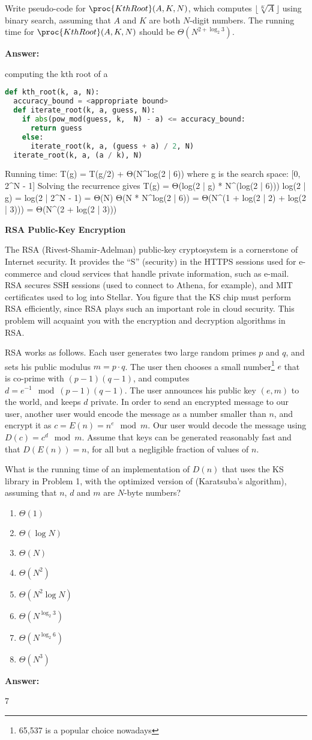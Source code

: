 \documentclass[12pt,twoside]{article}
\newcommand{\answer}{
 \par\medskip
 \textbf{Answer:}
}
\newcommand{\answerIp}{ \answer
computing the kth root of a
\begin{lstlisting}[language=Python]
def kth_root(k, a, N):
  accuracy_bound = <appropriate bound>
  def iterate_root(k, a, guess, N):
    if abs(pow_mod(guess, k,  N) - a) <= accuracy_bound:
      return guess
    else:
      iterate_root(k, a, (guess + a) / 2, N)
  iterate_root(k, a, (a / k), N)
\end{lstlisting}

Running time:
T(g) = T(g/2) + Θ(N^log(2 | 6))
where g is the search space: [0, 2^N - 1]
Solving the recurrence gives T(g) = Θ(log(2 | g) * N^(log(2 | 6)))
log(2 | g) = log(2 | 2^N - 1) = Θ(N)
Θ(N * N^log(2 | 6)) = Θ(N^(1 + log(2 | 2) + log(2 | 3))) = Θ(N^(2 + log(2 | 3)))
}
\newcommand{\answerIIa}{ \answer
7
}
\begin{document}
\begin{problems}
\begin{problemparts}
\problempart {} Write pseudo-code for $\proc{KthRoot}(A, K, N)$, which
computes $\lfloor \sqrt[K]{A} \rfloor$ using binary search, assuming that $A$
and $K$ are both $N$-digit numbers. The running time for $\proc{KthRoot}(A, K,
N)$ should be $\Theta(N^{2 + \log_2 3})$.

\answerIp

\end{problemparts}

\newpage

\problem {} \textbf{RSA Public-Key Encryption}

The RSA (Rivest-Shamir-Adelman) public-key cryptosystem is a cornerstone of
Internet security. It provides the ``S'' (security) in the HTTPS sessions used
for e-commerce and cloud services that handle private information, such as
e-mail. RSA secures SSH sessions (used to connect to Athena, for example), and
MIT certificates used to log into Stellar. You figure that the KS chip must
perform RSA efficiently, since RSA plays such an important role in cloud
security. This problem will acquaint you with the encryption and decryption
algorithms in RSA.

RSA works as follows. Each user generates two large random primes $p$ and $q$,
and sets his public modulus $m = p \cdot q$. The user then chooses a small
number\footnote{65,537 is a popular choice nowadays} $e$ that is co-prime with
$(p - 1)(q - 1)$, and computes $d = e^{-1} \mod (p - 1)(q - 1)$. The user
announces his public key $(e, m)$ to the world, and keeps $d$ private. In order
to send an encrypted message to our user, another user would encode the message
as a number smaller than $n$, and encrypt it as $c = E(n) = n^e \mod m$. Our
user would decode the message using $D(c) = c^d \mod m$. Assume that keys can be
generated reasonably fast and that $D(E(n)) = n$, for all but a negligible
fraction of values of $n$.

\begin{problemparts}
\problempart {} What is the running time of an implementation of $D(n)$
that uses the KS library in Problem 1, with the optimized version of
 (Karatsuba's algorithm), assuming that $n$, $d$ and $m$ are
$N$-byte numbers?
\begin{enumerate}
  \item $\Theta(1)$
  \item $\Theta(\log N)$
  \item $\Theta(N)$
  \item $\Theta(N^2)$
  \item $\Theta(N^2 \log N)$
  \item $\Theta(N^{\log_2 3})$
  \item $\Theta(N^{\log_2 6})$
  \item $\Theta(N^3)$
\end{enumerate}
\answerIIa


\end{problemparts}
\end{problems}
\end{document}
